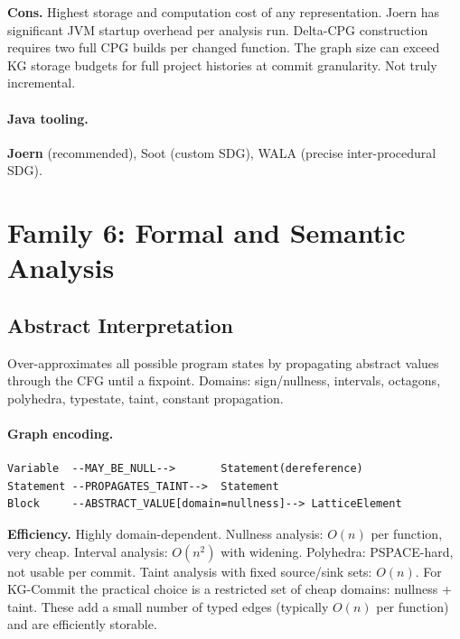 \documentclass[12pt,a4paper]{article}
\begin{document}
\begin{consbox}
\textbf{Cons.}
Highest storage and computation cost of any representation. Joern has
significant JVM startup overhead per analysis run. Delta-CPG construction
requires two full CPG builds per changed function. The graph size can exceed
KG storage budgets for full project histories at commit granularity. Not
truly incremental.
\end{consbox}

\paragraph{Java tooling.} \textbf{Joern} (recommended), Soot (custom SDG),
WALA (precise inter-procedural SDG).

\section{Family 6: Formal and Semantic Analysis}

\subsection{Abstract Interpretation}
\label{sec:ai}

Over-approximates all possible program states by propagating abstract values
through the CFG until a fixpoint. Domains: sign/nullness, intervals, octagons,
polyhedra, typestate, taint, constant propagation.

\paragraph{Graph encoding.}
\begin{lstlisting}
Variable  --MAY_BE_NULL-->       Statement(dereference)
Statement --PROPAGATES_TAINT-->  Statement
Block     --ABSTRACT_VALUE[domain=nullness]--> LatticeElement
\end{lstlisting}

\begin{effbox}
\textbf{Efficiency.}
Highly domain-dependent. Nullness analysis: $O(n)$ per function, very cheap.
Interval analysis: $O(n^2)$ with widening. Polyhedra: PSPACE-hard, not usable
per commit. Taint analysis with fixed source/sink sets: $O(n)$.
For KG-Commit the practical choice is a restricted set of cheap domains:
nullness + taint. These add a small number of typed edges (typically
$O(n)$ per function) and are efficiently storable.
\end{effbox}
\end{document}
